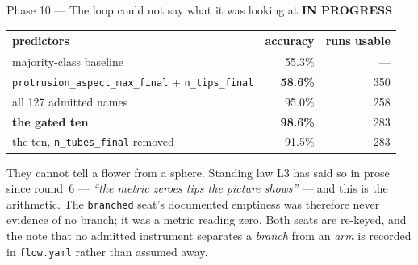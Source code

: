 \documentclass[11pt,a4paper]{article}
\newcommand{\code}[1]{\texttt{#1}}
\newcommand{\prog}{\textcolor{warn}{\textbf{IN PROGRESS}}}
\begin{document}
\begin{phasebox}{Phase 10 --- The loop could not say what it was looking at \hfill \prog}
\begin{center}\small
\begin{tabular}{@{}lrr@{}}
\toprule
predictors & accuracy & runs usable \\
\midrule
majority-class baseline & 55.3\% & --- \\
\code{protrusion\_aspect\_max\_final} + \code{n\_tips\_final} & \textbf{58.6\%} & 350 \\
all 127 admitted names & 95.0\% & 258 \\
\textbf{the gated ten} & \textbf{98.6\%} & 283 \\
the ten, \code{n\_tubes\_final} removed & 91.5\% & 283 \\
\bottomrule
\end{tabular}
\end{center}

\noindent They cannot tell a flower from a sphere. Standing law L3 has said so in prose since
round~6 --- \emph{``the metric zeroes tips the picture shows''} --- and this is the arithmetic.
The \code{branched} seat's documented emptiness was therefore never evidence of no branch; it was a
metric reading zero. Both seats are re-keyed, and the note that no admitted instrument separates a
\emph{branch} from an \emph{arm} is recorded in \code{flow.yaml} rather than assumed away.


\end{phasebox}
\end{document}
